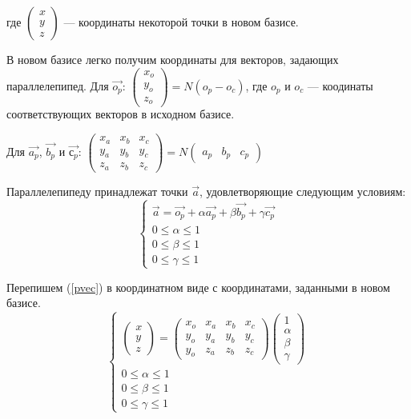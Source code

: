\documentclass[pdftex,ptm,12pt,a4paper]{report}
\begin{document}
      где $\begin{pmatrix} x \\ y \\ z \end{pmatrix}$ --- координаты некоторой точки в новом базисе.

      В новом базисе легко получим координаты для векторов, задающих параллелепипед.
      Для $\vec{o_p}$: 
      $\begin{pmatrix} x_o \\ y_o \\ z_o \end{pmatrix} =  N (o_p - o_c) $, где $o_p$ и $o_c$ --- коодинаты соответствующих векторов в исходном базисе.

      Для $\vec{a_p}$, $\vec{b_p}$ и $\vec{с_p}$:
      $\begin{pmatrix} x_a & x_b & x_c \\ y_a & y_b & y_c  \\ z_a & z_b & z_c \end{pmatrix} = 
      N \begin{pmatrix} a_p & b_p  & c_p \end{pmatrix}$

      Параллелепипеду принадлежат точки $\vec{a}$, удовлетворяющие следующим условиям:
      \begin{equation}\label{pvec}
        \begin{cases}
          \vec{a} = \vec{o_p} + \alpha \vec{a_p} + \beta \vec{b_p} + \gamma \vec{c_p} \\
          0 \le  \alpha   \le  1 \\
          0 \le  \beta   \le  1 \\
          0 \le  \gamma   \le  1 
        \end{cases}
      \end{equation}

      Перепишем (\ref{pvec}) в координатном виде с координатами, заданными в новом базисе.
      \begin{equation}\label{pcoord}
        \begin{cases}
          \begin{pmatrix} x \\ y \\ z \end{pmatrix}            
          =
          \begin{pmatrix} x_o & x_a & x_b & x_c \\ y_o & y_a & y_b & y_c  \\ y_o & z_a & z_b & z_c 
          \end{pmatrix} \begin {pmatrix} 1 \\ \alpha \\ \beta \\ \gamma \end{pmatrix} \\
          0 \le  \alpha   \le  1 \\
          0 \le  \beta   \le  1 \\
          0 \le  \gamma   \le  1 
        \end{cases}
      \end{equation}
\end{document}
